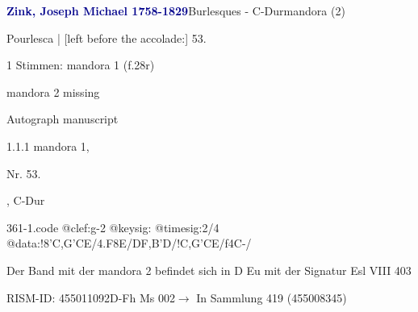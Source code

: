 \documentclass[twocolumn, 12pt]{book}
\begin{document}
\par \vspace{16pt} \textcolor{darkblue}{\textbf{Zink, Joseph Michael  1758-1829}}\hfillplus{\textbf{[361]}}\newline Burlesques - C-Dur\newline mandora (2)
\par \begin{itshape}[f.28r, at left:] Pourlesca | [left before the accolade:] 53.\end{itshape} 
\par \textcolor{darkblue}{}  1 Stimmen: mandora 1  (f.28r)\newline \begin{small} mandora 2 missing\end{small} \newline Autograph manuscript
\par 1.1.1  mandora 1, \begin{itshape}Nr. 53.\end{itshape}, C-Dur  
\begin{filecontents*}{361-1.code}
@clef:g-2
@keysig:
@timesig:2/4
@data:!8'C,G'CE/4.F8E/DF{,B'D}/!C,G'CE/f4C-/
\end{filecontents*}
\newline %
\par Der Band mit der mandora 2 befindet sich in D Eu mit der Signatur Esl VIII 403
\par RISM-ID: 455011092\newline D-Fh  Ms 002\newline $\rightarrow$ In Sammlung 419 (455008345)
      
\end{document}
